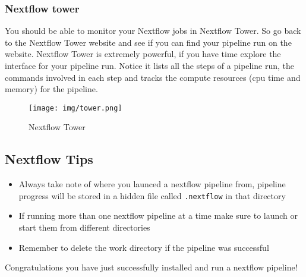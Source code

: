 \documentclass[11pt]{article}
\providecommand{\tightlist}{%
      \setlength{\itemsep}{0pt}\setlength{\parskip}{0pt}}
\begin{document}
    \hypertarget{nextflow-tower}{%
\subsubsection{Nextflow tower}\label{nextflow-tower}}

You should be able to monitor your Nextflow jobs in Nextflow Tower. So
go back to the Nextflow Tower website and see if you can find your
pipeline run on the website. Nextflow Tower is extremely powerful, if
you have time explore the interface for your pipeline run. Notice it
lists all the steps of a pipeline run, the commands involved in each
step and tracks the compute resources (cpu time and memory) for the
pipeline.

    \begin{figure}
\centering
\texttt{[image: img/tower.png]}
\caption{Nextflow Tower}
\end{figure}

    \hypertarget{nextflow-tips}{%
\subsection{Nextflow Tips}\label{nextflow-tips}}

\begin{itemize}
\tightlist
\item
  Always take note of where you launced a nextflow pipeline from,
  pipeline progress will be stored in a hidden file called
  \texttt{.nextflow} in that directory
\item
  If running more than one nextflow pipeline at a time make sure to
  launch or start them from different directories
\item
  Remember to delete the work directory if the pipeline was successful
\end{itemize}

    Congratulations you have just successfully installed and run a nextflow
pipeline!


\end{document}
